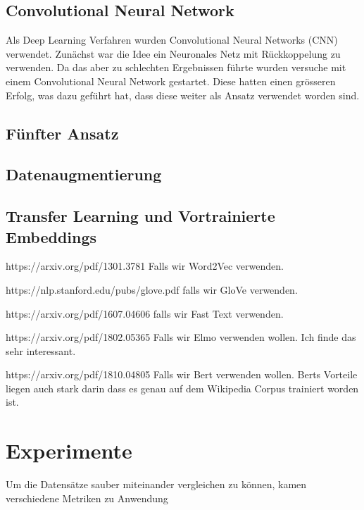 \documentclass[researchlab,palatino]{AIGpaper}
\begin{document}
\subsection{Convolutional Neural Network}
Als Deep Learning Verfahren wurden Convolutional Neural Networks (CNN) verwendet. Zunächst war die Idee ein Neuronales Netz mit Rückkoppelung zu verwenden. Da das aber zu schlechten Ergebnissen führte wurden versuche mit einem Convolutional Neural Network gestartet. Diese hatten einen grösseren Erfolg, was dazu geführt hat, dass diese weiter als Ansatz verwendet worden sind.

\subsection{Fünfter Ansatz}


\subsection{Datenaugmentierung}

\subsection{Transfer Learning und Vortrainierte Embeddings}

https://arxiv.org/pdf/1301.3781 Falls wir Word2Vec verwenden.

https://nlp.stanford.edu/pubs/glove.pdf falls wir GloVe verwenden.


https://arxiv.org/pdf/1607.04606 falls wir Fast Text verwenden.

https://arxiv.org/pdf/1802.05365 Falls wir Elmo verwenden wollen. Ich finde das sehr interessant.


https://arxiv.org/pdf/1810.04805 Falls wir Bert verwenden wollen. Berts Vorteile liegen auch stark darin dass es genau auf dem Wikipedia Corpus trainiert worden ist.

\section{Experimente}

Um die Datensätze sauber miteinander vergleichen zu können, kamen verschiedene Metriken zu Anwendung
\end{document}
